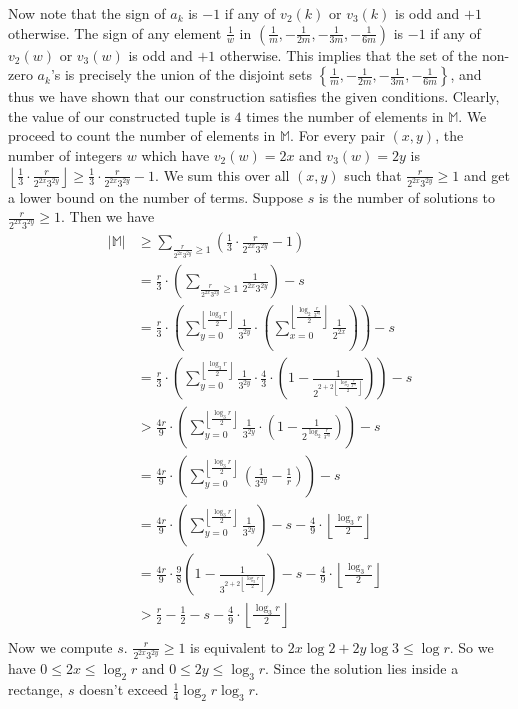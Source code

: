Now note that the sign of $a_k$ is $-1$ if any of $v_2(k)$ or $v_3(k)$ is odd and $+1$ otherwise.
The sign of any element $\frac{1}{w}$ in $\left(\frac{1}{m}, -\frac{1}{2m}, -\frac{1}{3m}, -\frac{1}{6m} \right)$ is $-1$ if any of $v_2(w)$ or $v_3(w)$ is odd and $+1$ otherwise. This implies that the set of the non-zero $a_k$'s is precisely the union of the disjoint sets $\left\{\frac{1}{m}, -\frac{1}{2m}, -\frac{1}{3m}, -\frac{1}{6m} \right\}$, and thus we have shown that our construction satisfies the given conditions.
\nl
Clearly, the value of our constructed tuple is $4$ times the number of elements in $\mathbb{M}$. We proceed to count the number of elements in $\mathbb{M}$.\nl
For every pair $(x, y)$, the number of integers $w$ which have $v_2(w) = 2x$ and $v_3(w) = 2y$ is $\left\lfloor \frac{1}{3} \cdot \frac{r}{2^{2x}3^{2y}} \right\rfloor \ge \frac{1}{3} \cdot \frac{r}{2^{2x}3^{2y}} - 1$. We sum this over all $(x, y)$ such that $\frac{r}{2^{2x}3^{2y}} \ge 1$ and get a lower bound on the number of terms. Suppose $s$ is the number of solutions to $\frac{r}{2^{2x}3^{2y}} \ge 1$. Then we have
\begin{align*}
    |\mathbb{M}| & \ge \sum_{\frac{r}{2^{2x}3^{2y}} \ge 1}  \left( \frac{1}{3} \cdot \frac{r}{2^{2x}3^{2y}} - 1 \right)\\
    & = \frac{r}{3} \cdot \left( \sum_{\frac{r}{2^{2x}3^{2y}} \ge 1} \frac{1}{2^{2x}3^{2y}} \right) - s\\
    & = \frac{r}{3} \cdot \left( \sum_{y = 0}^{\left\lfloor\frac{\log_3 r}{2}\right\rfloor} \frac{1}{3^{2y}} \cdot \left( \sum_{x = 0}^{\left\lfloor\frac{\log_2 \frac{r}{3^{2y}}}{2}\right\rfloor} \frac{1}{2^{2x}} \right) \right) - s\\
    & = \frac{r}{3} \cdot \left( \sum_{y = 0}^{\left\lfloor\frac{\log_3 r}{2}\right\rfloor} \frac{1}{3^{2y}} \cdot \frac{4}{3} \cdot \left( 1 - \frac{1}{2^{2 + 2\left\lfloor\frac{\log_2 \frac{r}{3^{2y}}}{2}\right\rfloor}} \right) \right) - s\\
    & > \frac{4r}{9} \cdot \left( \sum_{y = 0}^{\left\lfloor\frac{\log_3 r}{2}\right\rfloor} \frac{1}{3^{2y}} \cdot \left( 1 - \frac{1}{2^{\log_2 \frac{r}{3^{2y}}}} \right) \right) - s\\
    & = \frac{4r}{9} \cdot \left( \sum_{y = 0}^{\left\lfloor\frac{\log_3 r}{2}\right\rfloor} \left( \frac{1}{3^{2y}} - \frac{1}{r} \right) \right) - s			\\ 
    & = \frac{4r}{9} \cdot \left( \sum_{y = 0}^{\left\lfloor\frac{\log_3 r}{2}\right\rfloor}\frac{1}{3^{2y}} \right) - s - \frac{4}{9} \cdot \left\lfloor\frac{\log_3 r}{2}\right\rfloor\\
    & = \frac{4r}{9} \cdot \frac{9}{8} \left( 1 - \frac{1}{3^{2 + 2\left\lfloor\frac{\log_3 r}{2}\right\rfloor}} \right) - s - \frac{4}{9} \cdot \left\lfloor\frac{\log_3 r}{2}\right\rfloor\\
    & > \frac{r}{2} - \frac{1}{2} - s - \frac{4}{9} \cdot \left\lfloor\frac{\log_3 r}{2}\right\rfloor\\
\end{align*}Now we compute $s$. $\frac{r}{2^{2x}3^{2y}} \ge 1$ is equivalent to $2x \log 2 + 2y \log 3 \le \log r$. So we have $0 \le 2x \le \log_2 r$ and $0 \le 2y \le \log_3 r$. Since the solution lies inside a rectange, $s$ doesn't exceed $\frac{1}{4} \log_2 r \log_3 r$.
